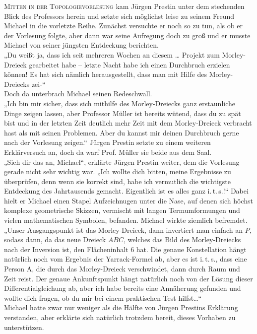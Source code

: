 \documentclass[oneside]{memoir}
\begin{document}
\medskip
\lettrine{M}{itten in der Topologievorlesung} kam Jürgen Prestin unter dem stechenden Blick des Professors herein und setzte sich möglichst leise zu seinem Freund Michael in die vorletzte Reihe. Zunächst versuchte er noch so zu tun, als ob er der Vorlesung folgte, aber dann war seine Aufregung doch zu groß und er musste Michael von seiner jüngsten Entdeckung berichten. \\
 „Du weißt ja, dass ich seit mehreren Wochen an diesem \ldots{} Projekt zum Morley-Dreieck gearbeitet habe -- letzte Nacht habe ich einen Durchbruch erzielen können! Es hat sich nämlich herausgestellt, dass man mit Hilfe des Morley-Dreiecks zei-“  \\
Doch da unterbrach Michael seinen Redeschwall. \\
„Ich bin mir sicher, dass sich mithilfe des Morley-Dreiecks ganz erstaunliche Dinge zeigen lassen, aber Professor Müller ist bereits wütend, dass du zu spät bist und in der letzten Zeit deutlich mehr Zeit mit dem Morley-Dreieck verbracht hast als mit seinen Problemen. Aber du kannst mir deinen Durchbruch gerne nach der Vorlesung zeigen.“ Jürgen Prestin setzte zu einem weiteren Erklärversuch an, doch da warf Prof. Müller sie beide aus dem Saal. \\
„Sieh dir das an, Michael“, erklärte Jürgen Prestin weiter, dem die Vorlesung gerade nicht sehr wichtig war. „Ich wollte dich bitten, meine Ergebnisse zu überprüfen, denn wenn sie korrekt sind, habe ich vermutlich die wichtigste Entdeckung des Jahrtausends gemacht. Eigentlich ist es alles ganz i.\,t.\,s.!“ Dabei hielt er Michael einen Stapel Aufzeichnugen unter die Nase, auf denen sich höchst komplexe geometrische Skizzen, vermischt mit langen Termumformungen und vielen mathematischen Symbolen, befanden. Michael wirkte ziemlich befremdet. \\
„Unser Ausgangspunkt ist das Morley-Dreieck, dann invertiert man einfach an $P$, sodass dann, da das neue Dreieck $ABC$, welches das Bild des Morley-Dreiecks nach der Inversion ist, den Flächeninhalt 6 hat. Die genaue Konstellation hängt natürlich noch vom Ergebnis der Yarrack-Formel ab, aber es ist i.\,t.\,s., dass eine Person A, die durch das Morley-Dreieck verschwindet, dann durch Raum und Zeit reist. Der genaue Ankunftspunkt hängt natürlich noch von der Lösung dieser Differentialgleichung ab, aber ich habe bereits eine Annäherung gefunden und wollte dich fragen, ob du mir bei einem praktischen Test hilfst\ldots“ \\
Michael hatte zwar nur  weniger als die Hälfte von Jürgen Prestins Erklärung verstanden, aber erklärte sich natürlich trotzdem bereit, dieses Vorhaben zu unterstützen.  \\
\end{document}

